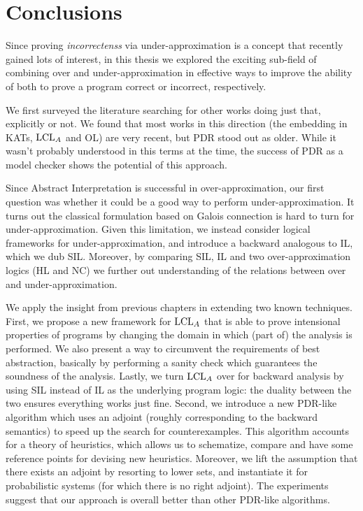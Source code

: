 
\chapter{Conclusions}\label{ch:conclusions}
Since proving \emph{incorrectenss} via under-approximation is a concept that recently gained lots of interest, in this thesis we explored the exciting sub-field of combining over and under-approximation in effective ways to improve the ability of both to prove a program correct or incorrect, respectively.

We first surveyed the literature searching for other works doing just that, explicitly or not. We found that most works in this direction (the embedding in KATs, $\text{LCL}_A$ and OL) are very recent, but PDR stood out as older. While it wasn't probably understood in this terms at the time, the success of PDR as a model checker shows the potential of this approach.

Since Abstract Interpretation is successful in over-approximation, our first question was whether it could be a good way to perform under-approximation. It turns out the classical formulation based on Galois connection is hard to turn for under-approximation. Given this limitation, we instead consider logical frameworks for under-approximation, and introduce a backward analogous to IL, which we dub SIL. Moreover, by comparing SIL, IL and two over-approximation logics (HL and NC) we further out understanding of the relations between over and under-approximation.

We apply the insight from previous chapters in extending two known techniques.
First, we propose a new framework for $\text{LCL}_A$ that is able to prove intensional properties of programs by changing the domain in which (part of) the analysis is performed. We also present a way to circumvent the requirements of best abstraction, basically by performing a sanity check which guarantees the soundness of the analysis. Lastly, we turn $\text{LCL}_A$ over for backward analysis by using SIL instead of IL as the underlying program logic: the duality between the two ensures everything works just fine.
Second, we introduce a new PDR-like algorithm which uses an adjoint (roughly corresponding to the backward semantics) to speed up the search for counterexamples. This algorithm accounts for a theory of heuristics, which allows us to schematize, compare and have some reference points for devising new heuristics. Moreover, we lift the assumption that there exists an adjoint by resorting to lower sets, and instantiate it for probabilistic systems (for which there is no right adjoint). The experiments suggest that our approach is overall better than other PDR-like algorithms.

